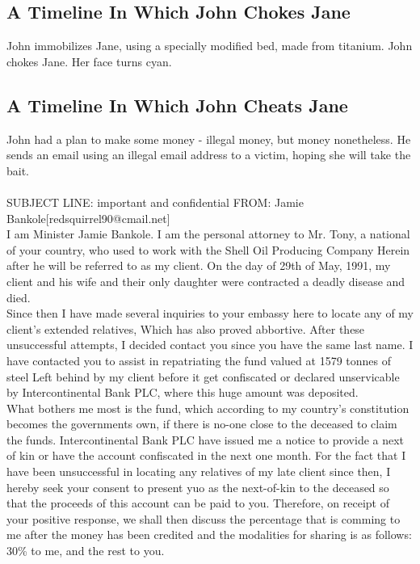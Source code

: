 \documentclass{article}
\begin{document}
\subsection{A Timeline In Which John Chokes Jane}


John immobilizes Jane, using a specially modified bed, made from titanium.
John chokes Jane.
Her face turns cyan.
\subsection{A Timeline In Which John Cheats Jane}


John had a plan to make some money {-} illegal money, but money nonetheless.
He sends an email using an illegal email address to a victim, hoping she will take the bait.
\\\\
SUBJECT LINE: important and confidential
FROM: Jamie Bankole[redsquirrel90@cmail.net]
\\
I am Minister Jamie Bankole.
I am the personal attorney to Mr. Tony, a national of your country, who used to work with the Shell Oil Producing Company
Herein after he will be referred to as my client.
On the day of 29th of May, 1991, my client and his wife and their only daughter were contracted a deadly disease and died.
\\
Since then I have made several inquiries to your embassy here to locate any of my client's extended relatives, Which has also proved abbortive.
After these unsuccessful attempts, I decided contact you since you have the same last name.
I have contacted you to assist in repatriating the fund valued at 1579 tonnes of steel Left behind by my client before it get confiscated or declared unservicable by Intercontinental Bank PLC, where this huge amount was deposited.
\\
What bothers me most is the fund, which according to my country's constitution becomes the governments own, if there is no{-}one close to the deceased to claim the funds.
Intercontinental Bank PLC have issued me a notice to provide a next of kin or have the account confiscated in the next one month.
For the fact that I have been unsuccessful in locating any relatives of my late client since then, I hereby seek your consent to present yuo as the next{-}of{-}kin to the deceased so that the proceeds of this account can be paid to you.
Therefore, on receipt of your positive response, we shall then discuss the percentage that is comming to me after the money has been credited and the modalities for sharing is as follows: 30\% to me, and the rest to you.
\end{document}
